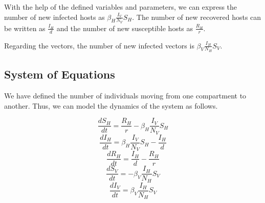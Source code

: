 With the help of the defined variables and parameters, we can express the number of new infected hosts as $\beta_H \frac{I_V}{N_V} S_H$. The number of new recovered hosts can be written as $\frac{I_H}{d}$ and the number of new susceptible hosts as $\frac{R_H}{r}$.

Regarding the vectors, the number of new infected vectors is $\beta_V \frac{I_H}{N_H} S_V$.

\subsection*{System of Equations}

We have defined the number of individuals moving from one compartment to another. Thus, we can model the dynamics of the system as follows.

\begin{equation}
    \frac{dS_H}{dt} = \frac{R_H}{r} - \beta_H \frac{I_V}{N_V} S_H
\end{equation}
\begin{equation}
    \frac{dI_H}{dt} = \beta_H \frac{I_V}{N_V} S_H - \frac{I_H}{d}
\end{equation}
\begin{equation}
    \frac{dR_H}{dt} = \frac{I_H}{d} - \frac{R_H}{r}
\end{equation}
\begin{equation}
    \frac{dS_V}{dt} = -\beta_V \frac{I_H}{N_H} S_V
\end{equation}
\begin{equation}
    \frac{dI_V}{dt} = \beta_V \frac{I_H}{N_H} S_V
\end{equation}